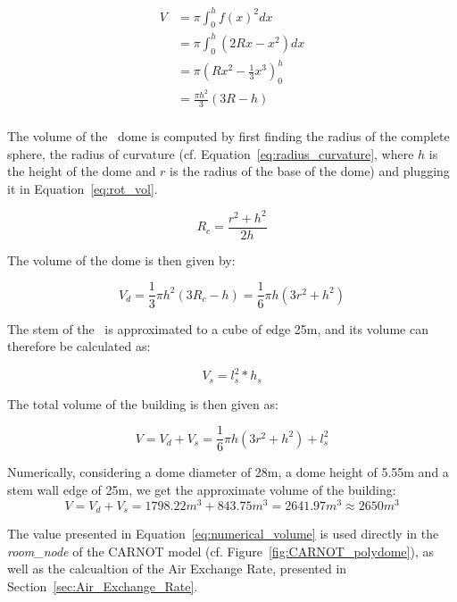 \begin{equation}\label{eq:rot_vol}
    \begin{aligned}
        V &= \pi \int_0^h f(x)^2 dx \\
          &= \pi \int_0^h (2Rx - x^2)dx \\
          &= \pi \left( Rx^2 - \frac{1}{3}x^3 \right)_0^h \\
          &= \frac{\pi h^2}{3} (3R - h) \\
    \end{aligned}
\end{equation}

The volume of the \pdome\ dome is computed  by first finding the radius of the
complete sphere, the radius of curvature (cf.
Equation~\ref{eq:radius_curvature}, where $h$ is the height of the dome and $r$
is the radius of the base of the dome) and plugging it in
Equation~\ref{eq:rot_vol}.

\begin{equation}\label{eq:radius_curvature}
    R_c = \frac{r^2 + h^2}{2h}
\end{equation}

The volume of the dome is then given by: 

\begin{equation}
    V_d = \frac{1}{3} \pi h^2 (3R_c - h) = \frac{1}{6} \pi h (3r^2 + h^2)
\end{equation}

The stem of the \pdome\ is approximated to a cube of edge 25m, and its volume can
therefore be calculated as: 

\begin{equation}
    V_s = l_s^2 * h_s
\end{equation}

The total volume of the building is then given as: 

\begin{equation}
    V = V_d + V_s = \frac{1}{6} \pi h (3r^2 + h^2) + l_s^2
\end{equation}

Numerically, considering a dome diameter of 28m, a dome height of 5.55m and a stem
wall edge of 25m, we get the approximate volume of the building:
\begin{equation}\label{eq:numerical_volume}
    V = V_d + V_s = 1798.22m^3 + 843.75m^3 = 2641.97m^3 \approx 2650m^3
\end{equation}

The value presented in Equation~\ref{eq:numerical_volume} is used directly in
the \textit{room\_node} of the CARNOT model (cf.
Figure~\ref{fig:CARNOT_polydome}), as well as the calcualtion of the Air
Exchange Rate, presented in Section~\ref{sec:Air_Exchange_Rate}.

